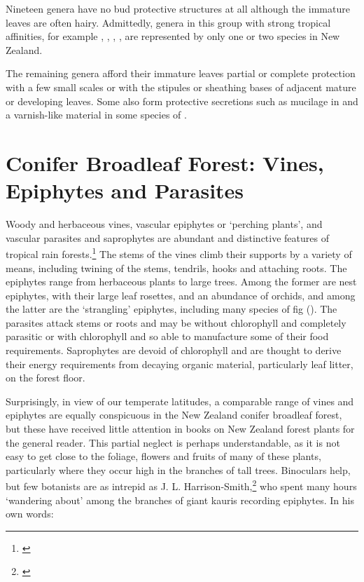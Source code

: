 Nineteen genera have no bud protective structures at all although the immature leaves are often hairy.
Admittedly, genera in this group with strong tropical affinities, for example , , , , are represented by only one or two species in New Zealand.

The remaining genera afford their immature leaves partial or complete protection with a few small scales or with the stipules or sheathing bases of adjacent mature or developing leaves.
Some also form protective secretions such as mucilage in  and a varnish-like material in some species of .

\chapter{Conifer Broadleaf Forest: Vines, Epiphytes and Parasites}

Woody and herbaceous vines, vascular epiphytes or `perching plants', and vascular parasites and saprophytes are abundant and distinctive features of tropical rain forests.\footnote{\cite{richards1952tropical}}
The stems of the vines climb their supports by a variety of means, including twining of the stems, tendrils, hooks and attaching roots.
The epiphytes range from herbaceous plants to large trees.
Among the former are nest epiphytes, with their large leaf rosettes, and an abundance of orchids, and among the latter are the `strangling' epiphytes, including many species of fig ().
The parasites attack stems or roots and may be without chlorophyll and completely parasitic or with chlorophyll and so able to manufacture some of their food requirements.
Saprophytes are devoid of chlorophyll and are thought to derive their energy requirements from decaying organic material, particularly leaf litter, on the forest floor.

Surprisingly, in view of our temperate latitudes, a comparable range of vines and epiphytes are equally conspicuous in the New Zealand conifer broadleaf forest, but these have received little attention in books on New Zealand forest plants for the general reader.
This partial neglect is perhaps understandable, as it is not easy to get close to the foliage, flowers and fruits of many of these plants, particularly where they occur high in the branches of tall trees.
Binoculars help, but few botanists are as intrepid as J. L. Harrison-Smith,\footnote{\cite{harrisonsmith1938kauri}} who spent many hours `wandering about' among the branches of giant kauris recording epiphytes.
In his own words:

